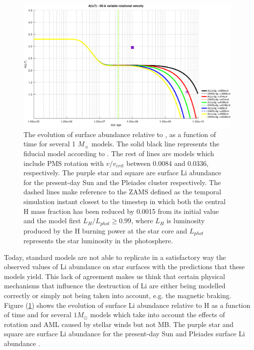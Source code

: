 \documentclass[fleqn,usenatbib]{mnras}
\begin{document}
\begin{figure}
	\includegraphics[width=\columnwidth]{figures/li_var_vel_0_0g.eps}
    \caption{The evolution of surface  abundance relative to , as a function of time for several 1 $M_{\sun}$ models. The solid black line represents the fiducial model according to \citet{Choi2016}. The rest of lines are models which include PMS rotation with $v/v_{crit}$ between 0.0084 and 0.0336, respectively. The purple star and square are surface Li abundance for the present-day Sun \citep{Asplund2009} and the Pleiades cluster \citep{Sestito2005} respectively. The dashed lines make reference to the ZAMS defined as the temporal simulation instant closest to the timestep in which both the central H mass fraction has been reduced by 0.0015 from its initial value and the model first $L_H/L_{phot} \geq 0.99$, where $L_{H}$ is luminosity produced by the H burning power at the star core and $L_{phot}$ represents the star luminosity in the photosphere.}
    \label{fig:li_var_vel_0g}
\end{figure}

Today, standard models are not able to replicate in a satisfactory way the observed values of Li abundance on star surfaces with the predictions that these models yield. This lack of agreement makes us think that certain physical mechanisms that influence the destruction of Li are either being modelled correctly or simply not being taken into account, e.g. the magnetic braking. Figure (\ref{fig:li_var_vel_0g}) shows the evolution of surface Li abundance relative to H as a function of time and for several $1M_{\odot}$ models which take into account the effects of rotation and AML caused by stellar winds but not MB. The purple star and square are surface Li abundance for the present-day Sun \citet{Asplund2009} and Pleiades surface Li abundance \citep{Sestito2005}.\par
\end{document}
